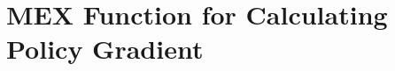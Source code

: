 
\chapter{MEX Function for Calculating Policy Gradient}
\label{app:GradientCImplementation}
\lstset{language=C++,columns=fullflexible,breaklines=true}

